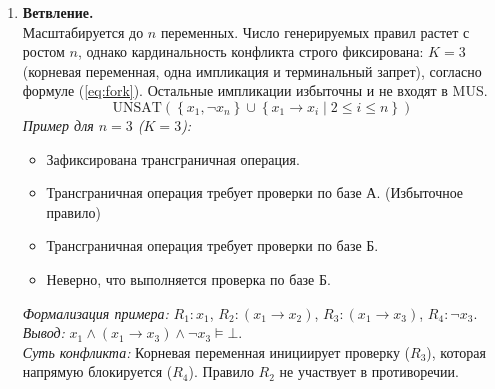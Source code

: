 \begin{enumerate}
\item \textbf{Ветвление.} \\
Масштабируется до $n$ переменных. Число генерируемых правил растет с ростом $n$, однако кардинальность конфликта строго фиксирована: $K=3$ (корневая переменная, одна импликация и терминальный запрет), согласно формуле (\ref{eq:fork}). Остальные импликации избыточны и не входят в MUS.
\begin{equation} \label{eq:fork} \text{UNSAT}\left( \left\{ x_1, \neg x_n \right\} \cup \left\{ x_1 \rightarrow x_i \mid 2 \le i \le n \right\} \right) \end{equation}
\textit{Пример для $n=3$ ($K=3$):}
\begin{itemize}
    \item [$R_1$:] Зафиксирована трансграничная операция.
    \item [$R_2$:] Трансграничная операция требует проверки по базе А. (Избыточное правило)
    \item [$R_3$:] Трансграничная операция требует проверки по базе Б.
    \item [$R_4$:] Неверно, что выполняется проверка по базе Б.
\end{itemize}
\textit{Формализация примера:} $R_1: x_1$, $R_2: (x_1 \rightarrow x_2)$, $R_3: (x_1 \rightarrow x_3)$, $R_4: \neg x_3$. \\
\textit{Вывод:} $x_1 \land (x_1 \rightarrow x_3) \land \neg x_3 \models \bot$. \\
\textit{Суть конфликта:} Корневая переменная инициирует проверку ($R_3$), которая напрямую блокируется ($R_4$). Правило $R_2$ не участвует в противоречии.


\end{enumerate}
